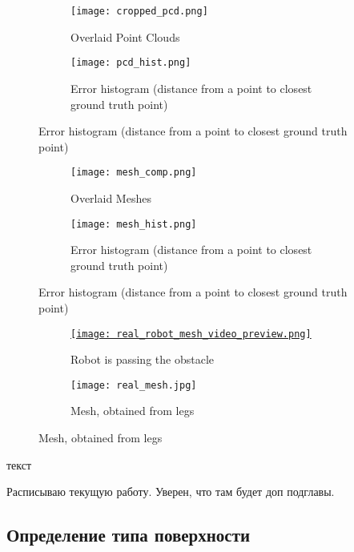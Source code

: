 \begin{figure}[H]
    \begin{subfigure}[t]{0.49\textwidth}
        \centering\texttt{[image: cropped\_pcd.png]}
        \caption*{Overlaid Point Clouds}
    \end{subfigure}
    \begin{subfigure}[t]{0.49\textwidth}
        \centering\texttt{[image: pcd\_hist.png]}
        \caption*{Error histogram (distance from a point to closest ground truth point)}
    \end{subfigure}
\end{figure}

\begin{figure}[H]
    \begin{subfigure}[t]{0.49\textwidth}
        \centering\texttt{[image: mesh\_comp.png]}
        \caption*{Overlaid Meshes}
    \end{subfigure}
    \begin{subfigure}[t]{0.49\textwidth}
        \centering\texttt{[image: mesh\_hist.png]}
        \caption*{Error histogram (distance from a point to closest ground truth point)}
    \end{subfigure}
\end{figure}

\begin{figure}[H]
    \begin{subfigure}[t]{0.49\textwidth}
        \href{https://youtu.be/2dxHHTG4psQ}{
            \centering\texttt{[image: real\_robot\_mesh\_video\_preview.png]}}
        \caption*{Robot is passing the obstacle}
    \end{subfigure}
    \begin{subfigure}[t]{0.49\textwidth}
        \centering\texttt{[image: real\_mesh.jpg]}
        \caption*{Mesh, obtained from legs}
    \end{subfigure}
\end{figure}

текст

Расписываю текущую работу. Уверен, что там будет доп подглавы.


\subsection{Определение типа поверхности}

